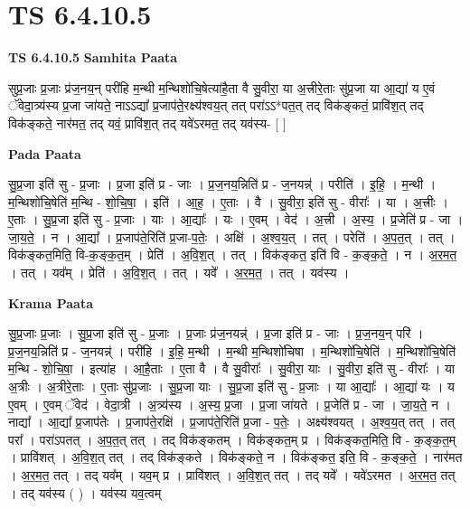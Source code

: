 \documentclass[17pt]{extarticle}
\begin{document}
\section{ TS 6.4.10.5 }

\textbf{TS 6.4.10.5 } \newline
\textbf{Samhita Paata} \newline

सुप्र॒जाः प्र॒जाः प्र॑ज॒नय॒न् परी॑हि म॒न्थी म॒न्थिशो॑चि॒षेत्या॑है॒ता वै सु॒वीरा॒ या अ॒त्त्रीरे॒ताः सु॑प्र॒जा या आ॒द्या॑ य ए॒वं ॅवेदा॒त्र्य॑स्य प्र॒जा जा॑यते॒ नाऽऽद्या᳚ प्र॒जाप॑ते॒रक्ष्य॑श्वय॒त् तत् परा॑ऽऽ*पत॒त् तद् विक॑ङ्कतं॒ प्रावि॑श॒त् तद् विक॑ङ्कते॒ नार॑मत॒ तद् यवं॒ प्रावि॑श॒त् तद् यवे॑ऽरमत॒ तद् यव॑स्य- [  ] \newline

\textbf{Pada Paata} \newline

सु॒प्र॒जा इति॑ सु - प्र॒जाः । प्र॒जा इति॑ प्र - जाः । प्र॒ज॒नय॒न्निति॑ प्र - ज॒नयन्न्॑ । परीति॑ । इ॒हि॒ । म॒न्थी । म॒न्थिशो॑चि॒षेति॑ म॒न्थि - शो॒चि॒षा॒ । इति॑ । आ॒ह॒ । ए॒ताः । वै । सु॒वीरा॒ इति॑ सु - वीराः᳚ । या । अ॒त्त्रीः । ए॒ताः । सु॒प्र॒जा इति॑ सु - प्र॒जाः । याः । आ॒द्याः᳚ । यः । ए॒वम् । वेद॑ । अ॒त्त्री । अ॒स्य॒ । प्र॒जेति॑ प्र - जा । जा॒य॒ते॒ । न । आ॒द्या᳚ । प्र॒जाप॑ते॒रिति॑ प्र॒जा-प॒तेः॒ । अक्षि॑ । अ॒श्व॒य॒त् । तत् । परेति॑ । अ॒प॒त॒त् । तत् । विक॑ङ्कत॒मिति॒ वि-क॒ङ्क॒त॒म् । प्रेति॑ । अ॒वि॒श॒त् । तत् । विक॑ङ्कत॒ इति॑ वि - क॒ङ्क॒ते॒ । न । अ॒र॒म॒त॒ । तत् । यव᳚म् । प्रेति॑ । अ॒वि॒श॒त् । तत् । यवे᳚ । अ॒र॒म॒त॒ । तत् । यव॑स्य ।  \newline


\textbf{Krama Paata} \newline

सु॒प्र॒जाः प्र॒जाः । सु॒प्र॒जा इति॑ सु - प्र॒जाः । प्र॒जाः प्र॑ज॒नयन्न्॑ । प्र॒जा इति॑ प्र - जाः । प्र॒ज॒नय॒न् परि॑ । प्र॒ज॒नय॒न्निति॑ प्र - ज॒नयन्न्॑ । परी॑हि । इ॒हि॒ म॒न्थी । म॒न्थी म॒न्थिशो॑चिषा । म॒न्थिशो॑चि॒षेति॑ । म॒न्थिशो॑चि॒षेति॑ म॒न्थि - शो॒चि॒षा॒ । इत्या॑ह । आ॒है॒ताः । ए॒ता वै । वै सु॒वीराः᳚ । सु॒वीरा॒ याः । सु॒वीरा॒ इति॑ सु - वीराः᳚ । या अ॒त्रीः । अ॒त्रीरे॒ताः । ए॒ताः सु॑प्र॒जाः । सु॒प्र॒जा याः । सु॒प्र॒जा इति॑ सु - प्र॒जाः । या आ॒द्याः᳚ । आ॒द्या॑ यः । य ए॒वम् । ए॒वम् ॅवेद॑ । वेदा॒त्री । अ॒त्र्य॑स्य । अ॒स्य॒ प्र॒जा । प्र॒जा जा॑यते । प्र॒जेति॑ प्र - जा । जा॒य॒ते॒ न । नाद्या᳚ । आ॒द्या᳚ प्र॒जाप॑तेः । प्र॒जाप॑ते॒रक्षि॑ । प्र॒जाप॑ते॒रिति॑ प्र॒जा - प॒तेः॒ । अक्ष्य॑श्वयत् । अ॒श्व॒य॒त् तत् । तत् परा᳚ । परा॑ऽपतत् । अ॒प॒त॒त् तत् । तद् विक॑ङ्‍कतम् । विक॑ङ्‍कत॒म् प्र । विक॑ङ्‍कत॒मिति॒ वि - क॒ङ्‍क॒त॒म् । प्रावि॑शत् । अ॒वि॒श॒त् तत् । तद् विक॑ङ्‍कते । विक॑ङ्‍कते॒ न । विक॑ङ्‍कत॒ इति॒ वि - क॒ङ्‍क॒ते॒ । नार॑मत । अ॒र॒म॒त॒ तत् । तद् यव᳚म् । यव॒म् प्र । प्रावि॑शत् । अ॒वि॒श॒त् तत् । तद् यवे᳚ । यवे॑ऽरमत । अ॒र॒म॒त॒ तत् । तद् यव॑स्य ( ) । यव॑स्य यव॒त्वम् \newline
\end{document}
